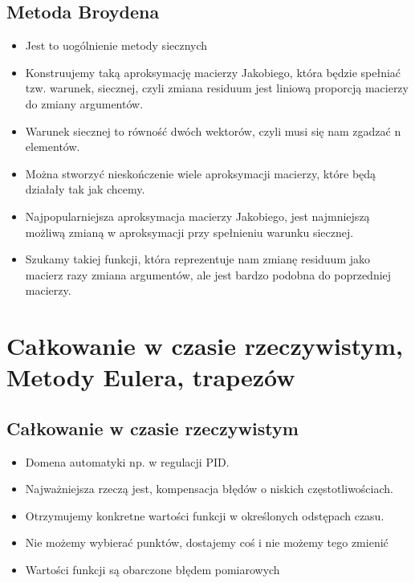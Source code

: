 \documentclass[a4paper]{article}
\begin{document}
\subsection{Metoda Broydena}
\begin{itemize}
    \item Jest to uogólnienie metody siecznych
    \item Konstruujemy taką aproksymację macierzy Jakobiego, która będzie spełniać tzw. warunek, siecznej, czyli zmiana residuum jest liniową proporcją macierzy do zmiany argumentów.
    \item Warunek siecznej to równość dwóch wektorów, czyli musi się nam zgadzać n elementów.
    \item Można stworzyć nieskończenie wiele aproksymacji macierzy, które będą działały tak jak chcemy.
    \item Najpopularniejsza aproksymacja macierzy Jakobiego, jest najmniejszą możliwą zmianą w aproksymacji przy spełnieniu warunku siecznej.
    \item Szukamy takiej funkcji, która reprezentuje nam zmianę residuum jako macierz razy zmiana argumentów, ale jest bardzo podobna do poprzedniej macierzy.
\end{itemize}

\section{Całkowanie w czasie rzeczywistym, Metody Eulera, trapezów}

\subsection{Całkowanie w czasie rzeczywistym}
\begin{itemize}
    \item Domena automatyki np. w regulacji PID.
    \item Najważniejsza rzeczą jest, kompensacja błędów o niskich częstotliwościach.
    \item Otrzymujemy konkretne wartości funkcji w określonych odstępach czasu.
    \item Nie możemy wybierać punktów, dostajemy coś i nie możemy tego zmienić
    \item Wartości funkcji są obarczone błędem pomiarowych
\end{itemize}
\end{document}
